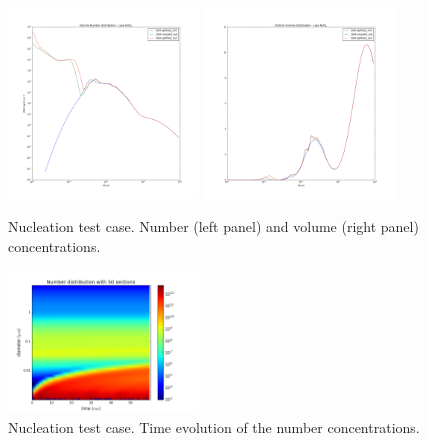 \documentclass[a4paper,11pt]{article}
\begin{document}
\begin{figure}[H]
        \begin{center}
                \includegraphics[angle=0,width=0.45\textwidth]{../graph/figure_ref/dNdlogd_nucl.png}
                \includegraphics[angle=0,width=0.45\textwidth]{../graph/figure_ref/dVdlogd_nucl.png}
        \end{center}
\caption{Nucleation test case. Number (left panel) and volume (right panel) concentrations.}
\label{fig-nucl}
\end{figure}
       

\begin{figure}[H]
        \begin{center}
                \includegraphics[angle=0,width=0.45\textwidth]{../graph/figure_ref/fig_banana.png}
        \end{center}
\caption{Nucleation test case. Time evolution of the number concentrations.}
\label{fig-nucl2}
\end{figure}
       
\end{document}
